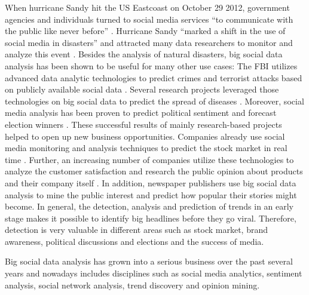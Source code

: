 When hurricane Sandy hit the US Eastcoast on October 29 2012, government agencies and individuals turned to social media services \enquote{to communicate with the public like never before} \cite{emergencymgmt2013sandy}. Hurricane Sandy \enquote{marked a shift in the use of social media in disasters} \cite[6]{security13sandy} and attracted many data researchers to monitor and analyze this event \cite{kumar2011tweettracker,carageamapping2014sandy}. Besides the analysis of natural disasters, big social data analysis has been shown to be useful for many other use cases: The FBI utilizes advanced data analytic technologies to predict crimes and terrorist attacks based on publicly available social data \cite{wang2012automatic}. Several research projects leveraged those technologies on big social data to predict the spread of diseases \cite{Google09detection,gft2014}. Moreover, social media analysis has been proven to predict political sentiment and forecast election winners \cite{bermingham2011using}. These successful results of mainly research-based projects helped to open up new business opportunities. Companies already use social media monitoring and analysis techniques to predict the stock market in real time \cite{bollen2011twitter,alcorn2013stockmarket}. Further, an increasing number of companies utilize these technologies to analyze the customer satisfaction and research the public opinion about products and their company itself \cite{journals/expert/CambriaSXH13}. In addition, newspaper publishers use big social data analysis to mine the public interest and predict how popular their stories might become. In general, the detection, analysis and prediction of trends in an early stage makes it possible to identify big headlines before they go viral. Therefore, detection is very valuable in different areas such as stock market, brand awareness, political discussions and elections and the success of media. 

Big social data analysis has grown into a serious business over the past several years and nowadays includes disciplines such as social media analytics, sentiment analysis, social network analysis, trend discovery and opinion mining.


